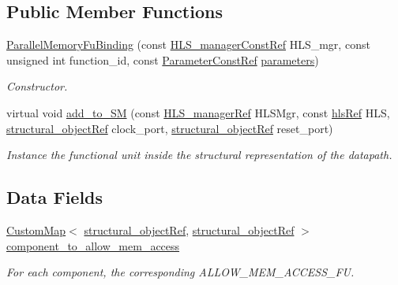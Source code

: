 \subsection*{Public Member Functions}
\begin{DoxyCompactItemize}
\item 
\hyperlink{classParallelMemoryFuBinding_a2e94bdeebfa78cd2cd61c5f80fdeb3f2}{Parallel\+Memory\+Fu\+Binding} (const \hyperlink{hls__manager_8hpp_a1b481383e3beabc89bd7562ae672dd8c}{H\+L\+S\+\_\+manager\+Const\+Ref} H\+L\+S\+\_\+mgr, const unsigned int function\+\_\+id, const \hyperlink{Parameter_8hpp_a37841774a6fcb479b597fdf8955eb4ea}{Parameter\+Const\+Ref} \hyperlink{classfu__binding_aa372286fd7ddc5ce6424afba333bb80a}{parameters})
\begin{DoxyCompactList}\small\item\em Constructor. \end{DoxyCompactList}\item 
virtual void \hyperlink{classParallelMemoryFuBinding_a63fd8380e73d6b06e4c4249a07d54aa8}{add\+\_\+to\+\_\+\+SM} (const \hyperlink{hls__manager_8hpp_acd3842b8589fe52c08fc0b2fcc813bfe}{H\+L\+S\+\_\+manager\+Ref} H\+L\+S\+Mgr, const \hyperlink{hls_8hpp_a75d0c73923d0ddfa28c4843a802c73a7}{hls\+Ref} H\+LS, \hyperlink{structural__objects_8hpp_a8ea5f8cc50ab8f4c31e2751074ff60b2}{structural\+\_\+object\+Ref} clock\+\_\+port, \hyperlink{structural__objects_8hpp_a8ea5f8cc50ab8f4c31e2751074ff60b2}{structural\+\_\+object\+Ref} reset\+\_\+port)
\begin{DoxyCompactList}\small\item\em Instance the functional unit inside the structural representation of the datapath. \end{DoxyCompactList}\end{DoxyCompactItemize}
\subsection*{Data Fields}
\begin{DoxyCompactItemize}
\item 
\hyperlink{custom__map_8hpp_a18ca01763abbe3e5623223bfe5aaac6b}{Custom\+Map}$<$ \hyperlink{structural__objects_8hpp_a8ea5f8cc50ab8f4c31e2751074ff60b2}{structural\+\_\+object\+Ref}, \hyperlink{structural__objects_8hpp_a8ea5f8cc50ab8f4c31e2751074ff60b2}{structural\+\_\+object\+Ref} $>$ \hyperlink{classParallelMemoryFuBinding_a4f44f1a4a3686f6881467732a8935287}{component\+\_\+to\+\_\+allow\+\_\+mem\+\_\+access}
\begin{DoxyCompactList}\small\item\em For each component, the corresponding A\+L\+L\+O\+W\+\_\+\+M\+E\+M\+\_\+\+A\+C\+C\+E\+S\+S\+\_\+\+FU. \end{DoxyCompactList}\end{DoxyCompactItemize}
